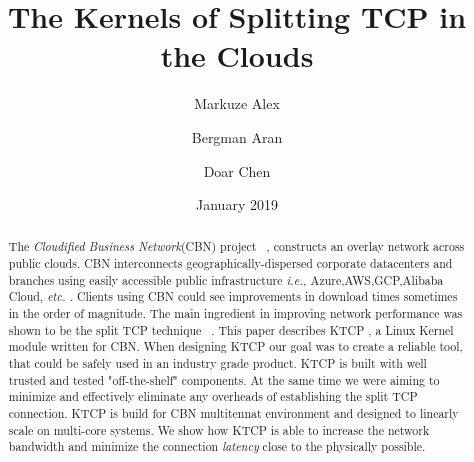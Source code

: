 \documentclass[newfonts=false,format=sigconf,10pt,letterpaper]{acmart}
\title{The Kernels of Splitting TCP in the Clouds}
\author{Markuze Alex}
\affiliation{%
  \institution{VMware Research}
  \country{Israel}
}
\author{Bergman Aran}
\affiliation{%
  \institution{VMware Research}
  \country{Israel}
}
\author{Doar Chen}
\affiliation{%
  \institution{VMware Research}
  \country{Israel}
}
\date{January 2019}
\providecommand{\ie}{\emph{i.e.,} }
\providecommand{\etc}{\emph{etc.} }
\newcommand{\oursys}{KTCP \xspace}
\begin{document}
\begin{abstract}
The \emph{Cloudified Business Network}(CBN) project ~\cite{Elastic, CDD}, constructs an overlay network across public clouds. CBN interconnects geographically-dispersed corporate datacenters and branches using easily accessible public infrastructure \ie Azure,AWS,GCP,Alibaba Cloud, \etc. Clients using CBN could see improvements in download times sometimes in the order of magnitude. The main ingredient in improving network performance was shown to be the split TCP technique ~\cite{CDD, }. \newline
This paper describes \oursys, a Linux Kernel module written for CBN. When designing \oursys our goal was to create a reliable tool, that could be safely used in an industry grade product. \oursys is built with well trusted and tested "off-the-shelf" components. At the same time we were aiming to  minimize and effectively eliminate any overheads of establishing the split TCP connection. \oursys is build for CBN multitennat environment and designed to linearly scale on multi-core systems. We show how \oursys is able to increase the network bandwidth and minimize the connection \emph{latency} close to the physically possible. 

\end{abstract}

\maketitle







\end{document}
